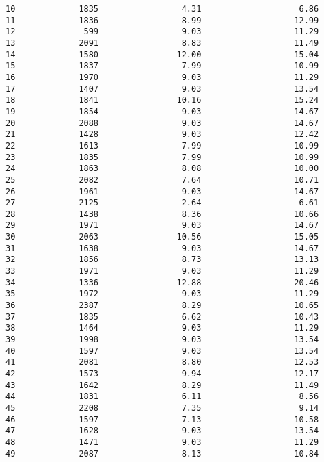 \documentclass[
]{article}
\begin{document}
\begin{verbatim}
10             1835                 4.31                    6.86
11             1836                 8.99                   12.99
12              599                 9.03                   11.29
13             2091                 8.83                   11.49
14             1580                12.00                   15.04
15             1837                 7.99                   10.99
16             1970                 9.03                   11.29
17             1407                 9.03                   13.54
18             1841                10.16                   15.24
19             1854                 9.03                   14.67
20             2088                 9.03                   14.67
21             1428                 9.03                   12.42
22             1613                 7.99                   10.99
23             1835                 7.99                   10.99
24             1863                 8.08                   10.00
25             2082                 7.64                   10.71
26             1961                 9.03                   14.67
27             2125                 2.64                    6.61
28             1438                 8.36                   10.66
29             1971                 9.03                   14.67
30             2063                10.56                   15.05
31             1638                 9.03                   14.67
32             1856                 8.73                   13.13
33             1971                 9.03                   11.29
34             1336                12.88                   20.46
35             1972                 9.03                   11.29
36             2387                 8.29                   10.65
37             1835                 6.62                   10.43
38             1464                 9.03                   11.29
39             1998                 9.03                   13.54
40             1597                 9.03                   13.54
41             2081                 8.80                   12.53
42             1573                 9.94                   12.17
43             1642                 8.29                   11.49
44             1831                 6.11                    8.56
45             2208                 7.35                    9.14
46             1597                 7.13                   10.58
47             1628                 9.03                   13.54
48             1471                 9.03                   11.29
49             2087                 8.13                   10.84

\end{verbatim}
\end{document}
